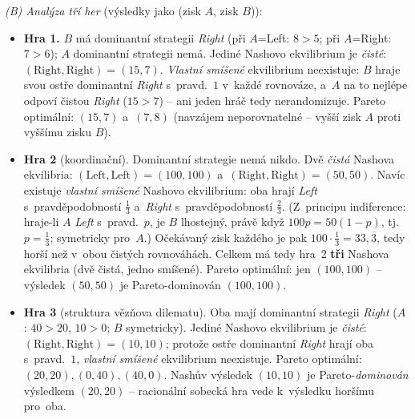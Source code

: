 \noindent\emph{(B) Analýza tří her} (výsledky jako (zisk $A$, zisk $B$)):
\begin{itemize}[nosep]
  \item \textbf{Hra 1.} $B$ má dominantní strategii \emph{Right} (při $A$=Left: $8>5$; při $A$=Right: $7>6$); $A$ dominantní strategii nemá. Jediné Nashovo ekvilibrium je \emph{čisté}: $(\text{Right},\text{Right})=(15,7)$. \emph{Vlastní smíšené} ekvilibrium neexistuje: $B$ hraje svou ostře dominantní \textit{Right} s~pravd.\ $1$ v~každé rovnováze, a~$A$ na to nejlépe odpoví čistou \textit{Right} ($15>7$) -- ani jeden hráč tedy nerandomizuje. Pareto optimální: $(15,7)$ a~$(7,8)$ (navzájem neporovnatelné -- vyšší zisk $A$ proti vyššímu zisku $B$).
  \item \textbf{Hra 2} (koordinační). Dominantní strategie nemá nikdo. Dvě \emph{čistá} Nashova ekvilibria: $(\text{Left},\text{Left})=(100,100)$ a~$(\text{Right},\text{Right})=(50,50)$. Navíc existuje \emph{vlastní smíšené} Nashovo ekvilibrium: oba hrají \textit{Left} s~pravděpodobností $\tfrac13$ a~\textit{Right} s~pravděpodobností $\tfrac23$. (Z~principu indiference: hraje-li $A$ \textit{Left} s~pravd.\ $p$, je $B$ lhostejný, právě když $100p=50(1-p)$, tj.\ $p=\tfrac13$; symetricky pro~$A$.) Očekávaný zisk každého je pak $100\cdot\tfrac13=33{,}\overline3$, tedy horší než v~obou čistých rovnováhách. Celkem má tedy hra~2 \textbf{tři} Nashova ekvilibria (dvě čistá, jedno smíšené). Pareto optimální: jen $(100,100)$ -- výsledek $(50,50)$ je Pareto-dominován $(100,100)$.
  \item \textbf{Hra 3} (struktura vězňova dilematu). Oba mají dominantní strategii \emph{Right} ($A$: $40>20$, $10>0$; $B$ symetricky). Jediné Nashovo ekvilibrium je \emph{čisté}: $(\text{Right},\text{Right})=(10,10)$; protože ostře dominantní \textit{Right} hrají oba s~pravd.\ $1$, \emph{vlastní smíšené} ekvilibrium neexistuje. Pareto optimální: $(20,20),(0,40),(40,0)$. Nashův výsledek $(10,10)$ je Pareto-\emph{dominován} výsledkem $(20,20)$ -- racionální sobecká hra vede k~výsledku horšímu pro~oba.
\end{itemize}

